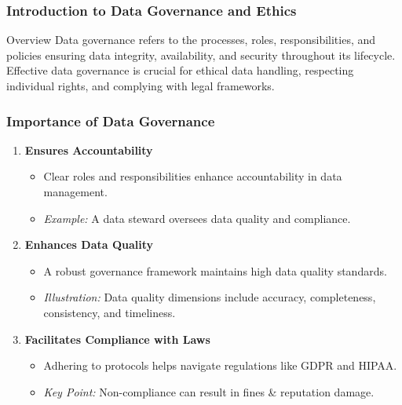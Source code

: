 \documentclass[aspectratio=169]{beamer}
\begin{document}
\frame{\titlepage}

\begin{frame}[fragile]
    \frametitle{Introduction to Data Governance and Ethics}
    \begin{block}{Overview}
        Data governance refers to the processes, roles, responsibilities, and policies ensuring data integrity, availability, and security throughout its lifecycle.
        Effective data governance is crucial for ethical data handling, respecting individual rights, and complying with legal frameworks.
    \end{block}
\end{frame}

\begin{frame}[fragile]
    \frametitle{Importance of Data Governance}
    \begin{enumerate}
        \item \textbf{Ensures Accountability}
        \begin{itemize}
            \item Clear roles and responsibilities enhance accountability in data management.
            \item \textit{Example:} A data steward oversees data quality and compliance.
        \end{itemize}

        \item \textbf{Enhances Data Quality}
        \begin{itemize}
            \item A robust governance framework maintains high data quality standards.
            \item \textit{Illustration:} Data quality dimensions include accuracy, completeness, consistency, and timeliness.
        \end{itemize}

        \item \textbf{Facilitates Compliance with Laws}
        \begin{itemize}
            \item Adhering to protocols helps navigate regulations like GDPR and HIPAA.
            \item \textit{Key Point:} Non-compliance can result in fines & reputation damage.
        \end{itemize}
    \end{enumerate}
\end{frame}
\end{document}
